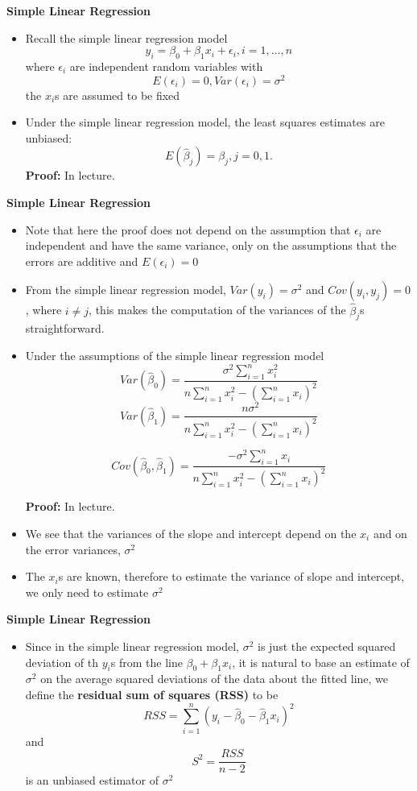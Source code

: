 \documentclass[landscape]{slides}
\newcommand{\heading}[1]{%
  \begin{center}
    \large\bf \color{red}
        #1
  \end{center}
  \vspace{1ex minus 1ex}}
\begin{document}
\begin{slide}
\heading{Simple Linear Regression}
\begin{itemize}
\item Recall the simple linear regression model
$$y_i=\beta_0+\beta_1x_i+\epsilon_i, i=1,\ldots,n$$
where $\epsilon_i$ are independent random variables with 
$$E(\epsilon_i)=0, Var(\epsilon_i)=\sigma^2$$
the $x_i$s are assumed to be fixed

\item Under the simple linear regression model, the least squares estimates are
unbiased: 
$$E(\hat{\beta}_j)=\beta_j, j=0,1.$$
{\bf Proof: } In lecture.
\end{itemize}
\end{slide}
\begin{slide}
\heading{Simple Linear Regression}
\begin{itemize}

\item Note that here the proof does not depend on the assumption that $\epsilon_i$
are independent and have the same variance, only on the assumptions that the 
errors are additive and $E(\epsilon_i)=0$

\item From the simple linear regression model, $Var(y_i)=\sigma^2$ and
$Cov(y_i,y_j)=0$, where $i\neq j$, this makes the computation of the variances
of the $\hat{\beta}_j$s straightforward.

\item Under the assumptions of the simple linear regression model
$$Var(\hat{\beta}_0)=\frac{\sigma^2\sum_{i=1}^nx_i^2}{n\sum_{i=1}^nx_i^2-(\sum_{i=1}^nx_i)^2}$$
$$Var(\hat{\beta}_1)=\frac{n\sigma^2}{n\sum_{i=1}^nx_i^2-(\sum_{i=1}^nx_i)^2}$$

$$Cov(\hat{\beta}_0,\hat{\beta}_1)=\frac{-\sigma^2\sum_{i=1}^nx_i}{n\sum_{i=1}^nx_i^2-(\sum_{i=1}^nx_i)^2}$$

{\bf Proof:} In lecture.

\item We see that the variances of the slope and intercept depend on the $x_i$ and
on the error variances, $\sigma^2$

\item The $x_i$s are known, therefore to estimate the variance of slope and
intercept, we only need to estimate $\sigma^2$

\end{itemize}
\end{slide}
\begin{slide}
\heading{Simple Linear Regression}
\begin{itemize}

\item Since in the simple linear regression model, $\sigma^2$ is just the expected
squared deviation of th $y_i$s from the line $\beta_0+\beta_1x_i$, it is 
natural to base an estimate of $\sigma^2$ on the average squared deviations
of the data about the fitted line, we define the {\bf residual sum of
squares (RSS)} to be
$$RSS=\sum_{i=1}^n(y_i-\hat{\beta}_0-\hat{\beta}_1x_i)^2$$
and
$$S^2=\frac{RSS}{n-2}$$
is an unbiased estimator of $\sigma^2$
\end{itemize}
\end{slide}
\end{document}

